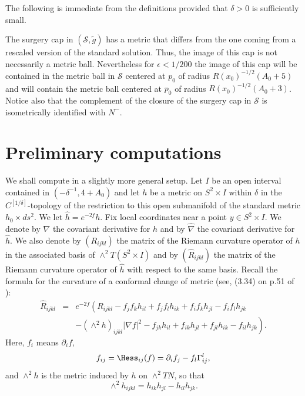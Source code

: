 The following is immediate from the definitions provided that
$\delta>0$ is sufficiently small.

\begin{lemma}
\label{lem:surgery-cap-ball-bounds}
\label{capball}
The surgery cap in $({\mathcal S},\tilde g)$ has a metric that
differs from the one coming from a rescaled version of the standard
solution. Thus, the image of this cap is not necessarily a metric
ball. Nevertheless for $\epsilon<1/200$ the image of this cap will
be contained in the metric ball in ${\mathcal S}$ centered at $p_0$
of radius $R(x_0)^{-1/2}(A_0+5)$ and will contain the metric ball
centered at $p_0$ of radius $R(x_0)^{-1/2}(A_0+3)$. Notice also that
the complement of the closure of the surgery cap in ${\mathcal S}$
is isometrically identified with $N^-$.
\end{lemma}


\section{Preliminary computations}

We shall compute  in a slightly more general setup.
 Let $I$ be an open interval contained in $(-\delta^{-1},4+A_0)$ and let
$h$ be a metric  on $S^2\times I$ within $\delta$ in the
$C^{[1/\delta]}$-topology of the restriction to this open
submanifold of the standard metric $h_0\times ds^2$.  We let $\hat
h=e^{-2f}h$. Fix local coordinates near a point $y\in S^2\times I$.
We denote by $\nabla$ the covariant derivative for $h$ and by
$\widehat\nabla$ the covariant derivative for $\hat h$.
 We also denote by
$(R_{ijkl})$ the matrix of the Riemann curvature operator of $h$
in the associated basis of $\wedge^2T(S^2\times I)$ and by $(\hat
R_{ijkl})$ the matrix of the Riemann curvature operator of $\hat
h$ with respect to the same basis. Recall the formula for the
curvature of a conformal change of metric (see, (3.34) on p.51 of
\cite{Sakai}):
\begin{eqnarray}\label{confchange}\hat R_{ijkl} & = &
e^{-2f}\left(R_{ijkl}-f_jf_kh_{il}+f_jf_lh_{ik}+f_if_kh_{jl}-f_if_lh_{jk}\right.
\\ & & \left.-
(\wedge^2h)_{ijkl}|\nabla
f|^2-f_{jk}h_{il}+f_{ik}h_{jl}+f_{jl}h_{ik}-f_{il}h_{jk}\right).\nonumber\end{eqnarray}
Here, $f_i$ means $\partial_if$,
$$f_{ij}=\Hess_{ij}(f)=\partial_if_j-f_l\Gamma_{ij}^l,$$
and $\wedge^2h$ is the metric induced by $h$ on $\wedge^2TN$, so
that
$$\wedge^2h_{ijkl}=h_{ik}h_{jl}-h_{il}h_{jk}.$$

